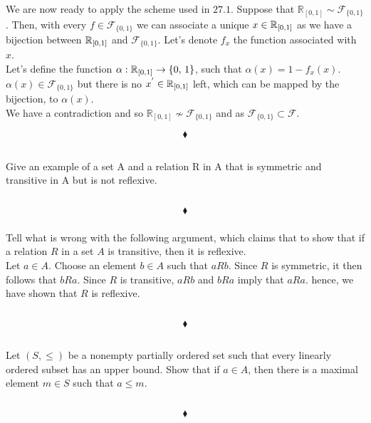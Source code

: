  We are now ready to apply the scheme used in $\mathbf{27.1}$. Suppose that $\mathbb{R}_{[0,1]}\sim \mathscr{F}_{\{0,1\}}$. Then, with every $f\in \mathscr{F}_{\{0,1\}}$ we can associate a unique $x\in \mathbb{R}_{[0,1]}$ as we have a bijection between $\mathbb{R}_{[0,1]}$ and $\mathscr{F}_{\{0,1\}}$. Let's denote $f_x$ the function associated with $x$. \\
 Let's define the function $\alpha: \mathbb{R}_{[0,1]}\rightarrow \{0,\,1\}$, such that $\alpha(x) = 1-f_x(x)$. $\alpha(x)\in \mathscr{F}_{\{0,1\}}$ but there is no $x^{'}\in \mathbb{R}_{[0,1]}$ left, which can be mapped by the bijection,  to $\alpha(x)$. \\
 We have a contradiction and so $\mathbb{R}_{[0,1]}\not \sim \mathscr{F}_{\{0,1\}}$ and as $\mathscr{F}_{\{0,1\}}\subset \mathscr{F}$.
 

$$\blacklozenge$$
\newpage


\renewcommand{\thesubsection}{\thesection.\RomanNumeralCaps{13}}
\subsection{}
\subsubsection{}
\begin{tcolorbox}
Give an example of a set A and a relation R in A that is symmetric and transitive in A but is not reflexive. 
\end{tcolorbox}
$$ $$

$$\blacklozenge$$

\subsubsection{}
\begin{tcolorbox}
Tell what is wrong with the following argument, which claims that to show that if a relation $R$ in a set $A$ is transitive, then it is reflexive.
\\
Let $a\in A$. Choose an element $b\in A$ such that $aRb$. Since $R$ is symmetric, it then follows that $bRa$. Since $R$ is transitive, $aRb$ and $bRa$ imply that $aRa$. hence, we have shown that $R$ is reflexive.
\end{tcolorbox}
$$ $$

$$\blacklozenge$$

\renewcommand{\thesubsection}{\thesection.\RomanNumeralCaps{14}}
\subsection{}
\begin{tcolorbox}
Let $(S,\leq )$ be a nonempty partially ordered set such that every linearly ordered subset has an upper bound. Show that if $a\in A$, then there is a maximal element $m\in S$ such that $a\leq m$. 
\end{tcolorbox}
$$ $$

$$\blacklozenge$$
